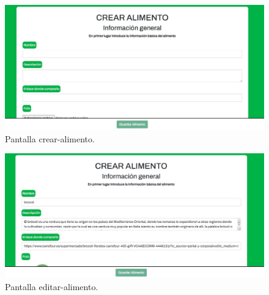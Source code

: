 \begin{figure}
  \centering
  \includegraphics[scale=0.30]{img/ma-crear-alimento.JPG}
  \caption{Pantalla crear-alimento.}
  \label{fig:ma-crear-alimento}
\end{figure}

\begin{figure}
  \centering
  \includegraphics[scale=0.30]{img/ma-editar-alimento.JPG}
  \caption{Pantalla editar-alimento.}
  \label{fig:ma-editar-alimento}
\end{figure}